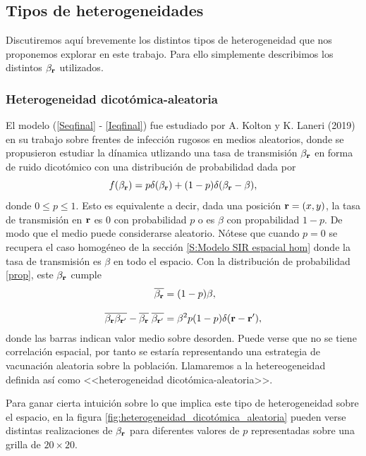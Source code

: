 \subsection{Tipos de heterogeneidades}

Discutiremos aquí brevemente los distintos tipos de heterogeneidad que nos proponemos explorar en este trabajo. Para ello simplemente describimos los distintos 
$\beta_{\vb r}$ utilizados.

\subsubsection*{Heterogeneidad dicotómica-aleatoria}

El modelo (\ref{Seqfinal} - \ref{Ieqfinal}) fue estudiado por A. Kolton y K. Laneri (2019) \cite{kolton} en su trabajo sobre frentes de infección
rugosos en medios aleatorios, donde se propusieron estudiar la dínamica utlizando una tasa de transmisión $\beta_{\vb r}$ en forma de ruido dicotómico
con una distribución de probabilidad dada por 
\begin{equation}
  f(\beta_{\vb r}) = p\delta(\beta_{\vb r}) + (1-p)\delta(\beta_{\vb r}-\beta),\label{prop}
\end{equation}
donde $0\leq p \leq 1$. Esto es equivalente a decir, dada una posición $\vb r = (x,y)$, la tasa de transmisión en $\vb r$ es $0$ con probabilidad $p$ o
es $\beta$ con propabilidad $1-p$. De modo que el medio puede considerarse aleatorio. Nótese que cuando $p=0$ se recupera el caso homogéneo de la 
sección \ref{S:Modelo SIR espacial hom} donde la tasa de transmisión es $\beta$ en todo el espacio. Con la distribución de probabilidad \ref{prop}, 
este $\beta_{\vb r}$ cumple 
\begin{align}
  \overline{\beta_{\vb{r}}}&= (1-p)\beta, \\[.3cm]
  \overline{\beta_{\vb r}\beta_{\vb{r'}}} - \overline{\beta_{\vb{r}}}\;\overline{\beta_{\vb{r'}}} &= \beta^2p(1-p)\delta(\vb r - \vb{r'}),
\end{align}
donde las barras indican valor medio sobre desorden. Puede verse que no se tiene correlación espacial, por tanto se estaría representando una estrategia de vacunación 
aleatoria sobre la población. Llamaremos a la hetereogeneidad definida así como <<heterogeneidad
dicotómica-aleatoria>>.

Para ganar cierta intuición sobre lo que implica este tipo de heterogeneidad sobre el espacio, en la figura \ref{fig:heterogeneidad_dicotómica_aleatoria} 
pueden verse distintas realizaciones de $\beta_{\vb r}$ para diferentes valores de $p$ representadas sobre una grilla de $20 \times 20$.

